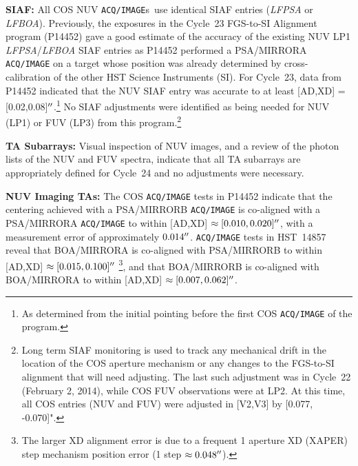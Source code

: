 \documentclass[12pt]{reportj}
\def\arcsec{\hbox{$^{\prime\prime}$}}
\newcommand{\pid}[1]{{\rm P}#1}
\newcommand{\tacq}[1]{\texttt{ACQ/#1}}
\begin{document}
\begin{description}
\item{\bf SIAF:}{
	All COS NUV \tacq{IMAGE}s~use identical SIAF entries ({\it LFPSA} or {\it LFBOA}).
	Previously, the exposures in the Cycle~23 FGS-to-SI Alignment program (\pid{14452}) gave a good estimate of the accuracy of the existing NUV LP1 {\it LFPSA}/{\it LFBOA} SIAF entries
	as \pid{14452} performed a PSA/MIRRORA \tacq{IMAGE} on a target whose position was already determined by cross-calibration of the other HST Science Instruments (SI).
	For Cycle~23, data from \pid{14452} indicated that the NUV SIAF entry was accurate to at least [AD,XD] = [0.02,0.08]$\arcsec$.\footnote{As determined from the initial pointing before the first COS \tacq{IMAGE} of the program.}
	No SIAF adjustments were identified as being needed for NUV (LP1) or FUV (LP3) from this program.\footnote{Long term SIAF monitoring is used to track any mechanical drift in the location of the COS aperture mechanism or any changes to the FGS-to-SI alignment that will need adjusting.
	The last such adjustment was in Cycle~22 (February 2, 2014), while COS FUV observations were at LP2. At this time, all COS entries (NUV and FUV) were adjusted in [V2,V3] by [0.077, -0.070]". }
}
\item{\bf TA Subarrays:} Visual inspection of NUV images, and a review of the photon lists of the NUV and FUV spectra, indicate that all TA subarrays are appropriately defined for Cycle~24 and no adjustments were necessary.
\item{\bf NUV Imaging TAs:}
	The COS \tacq{IMAGE}  tests in \pid{14452} indicate that the centering achieved with a PSA/MIRRORB \tacq{IMAGE} is co-aligned with a PSA/MIRRORA \tacq{IMAGE} to within [AD,XD] $\approx [0.010,0.020]\arcsec$, with a measurement error of approximately $0.014\arcsec$.
	\tacq{IMAGE}  tests in HST~14857 reveal that BOA/MIRRORA is co-aligned with PSA/MIRRORB to within [AD,XD] $\approx [0.015,0.100]\arcsec$
	\footnote{The larger XD alignment error is due to a frequent 1 aperture XD (XAPER) step mechanism position error (1 step $\approx 0.048\arcsec$).}, and that BOA/MIRRORB is co-aligned with BOA/MIRRORA to within [AD,XD] $\approx [0.007,0.062]\arcsec$.


\end{description}
\end{document}
